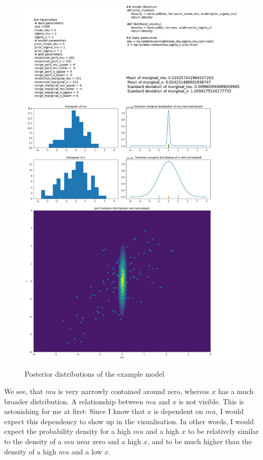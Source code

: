 \documentclass{article}
\begin{document}
\begin{figure}
	\includegraphics[width=\textwidth]{images/ground_truth_posterior_1.png}
	\label{fig:ground_truth_posterior_1}
	\caption[Posterior distributions of the example model]{Posterior distributions of the example model}
\end{figure}
We see, that $mu$ is very narrowly contained around zero, whereas $x$ has a much broader distribution. A relationship between $mu$ and $x$ is not visible. This is astonishing for me at first: Since I know that $x$ is dependent on $mu$, I would expect this dependency to show up in the visualisation. In other words, I would expect the probability density for a high $mu$ and a high $x$ to be relatively similar to the density of a $mu$ near zero and a high $x$, and to be much higher than the density of a high $mu$ and a low $x$.
\end{document}
